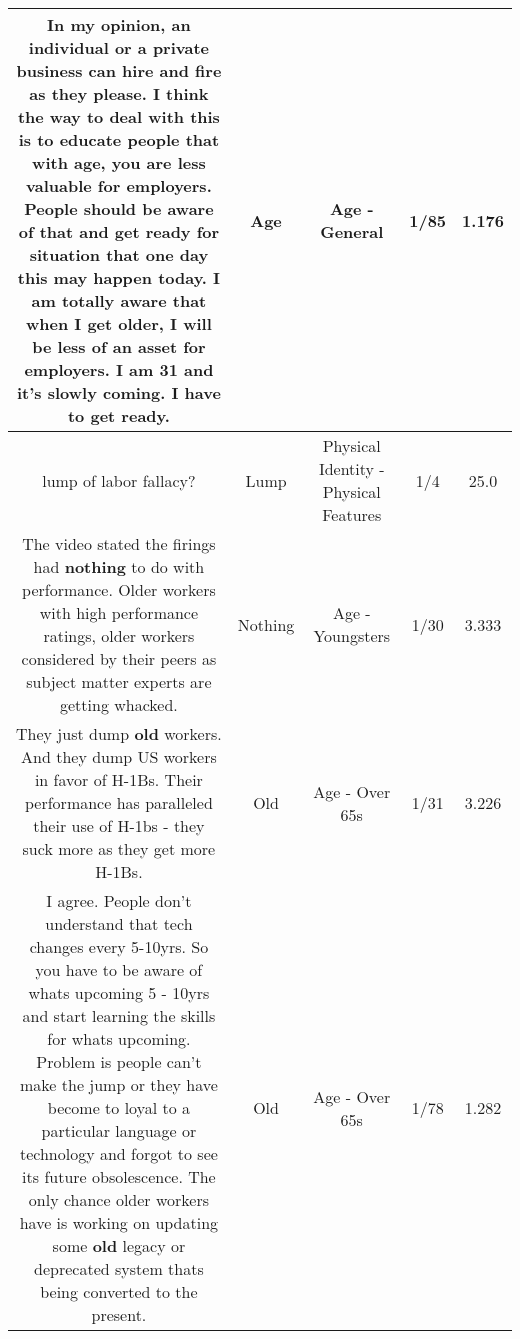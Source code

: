 \documentclass[11pt]{article}
\newlength\mylength
\begin{document}
\begin{center}
\begin{longtable}{|C{.65\mylength}|C{.30\mylength}|C{.12\mylength}|C{.12\mylength}|C{.12\mylength}|}
  \small In my opinion, an individual or a private business can hire and fire as they please. I think the way to deal with this is to educate people that with \textbf{age}, you are less valuable for employers. People should be aware of that and get ready for situation that one day this may happen today. I am totally aware that when I get older, I will be less of an asset for employers. I am 31 and it's slowly coming. I have to get ready.\normalsize   & Age & Age - General & 1/85 & 1.176 \\  \hline
  \small lump of labor fallacy?\normalsize   & Lump & Physical Identity - Physical Features & 1/4 & 25.0 \\  \hline
  \small The video stated the firings had \textbf{nothing} to do with performance. Older workers with high performance ratings, older workers considered by their peers as subject matter experts are getting whacked.\normalsize   & Nothing & Age - Youngsters & 1/30 & 3.333 \\  \hline
  \small They just dump \textbf{old} workers. And they dump US workers in favor of H-1Bs. Their performance has paralleled their use of H-1bs - they suck more as they get more H-1Bs.\normalsize   & Old & Age - Over 65s & 1/31 & 3.226 \\  \hline
  \small I agree. People don't understand that tech changes every 5-10yrs. So you have to be aware of whats upcoming 5 - 10yrs and start learning the skills for whats upcoming. Problem is people can't make the jump or they have become to loyal to a particular language or technology and forgot to see its future obsolescence. The only chance older workers have is working on updating some \textbf{old} legacy or deprecated system thats being converted to the present.\normalsize   & Old & Age - Over 65s & 1/78 & 1.282 \\  \hline

\end{longtable}
\end{center}
\end{document}

